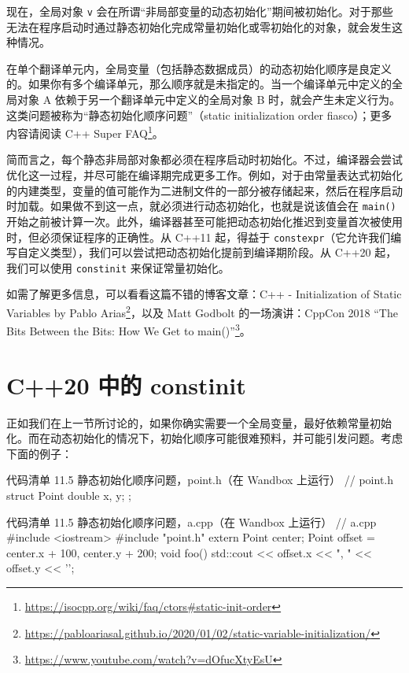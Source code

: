 现在，全局对象 \texttt{v} 会在所谓“非局部变量的动态初始化”期间被初始化。对于那些无法在程序启动时通过静态初始化完成常量初始化或零初始化的对象，就会发生这种情况。

\begin{myWarnBox}
在单个翻译单元内，全局变量（包括静态数据成员）的动态初始化顺序是良定义的。如果你有多个编译单元，那么顺序就是未指定的。当一个编译单元中定义的全局对象 A 依赖于另一个翻译单元中定义的全局对象 B 时，就会产生未定义行为。这类问题被称为“静态初始化顺序问题”（static initialization order fiasco）；更多内容请阅读 C++ Super FAQ\footnote{\url{https://isocpp.org/wiki/faq/ctors\#static-init-order}}。
\end{myWarnBox}

简而言之，每个静态非局部对象都必须在程序启动时初始化。不过，编译器会尝试优化这一过程，并尽可能在编译期完成更多工作。例如，对于由常量表达式初始化的内建类型，变量的值可能作为二进制文件的一部分被存储起来，然后在程序启动时加载。如果做不到这一点，就必须进行动态初始化，也就是说该值会在 \texttt{main()} 开始之前被计算一次。此外，编译器甚至可能把动态初始化推迟到变量首次被使用时，但必须保证程序的正确性。从 C++11 起，得益于 \texttt{constexpr}（它允许我们编写自定义类型），我们可以尝试把动态初始化提前到编译期阶段。从 C++20 起，我们可以使用 \texttt{constinit} 来保证常量初始化。

\begin{myInfoBox}
如需了解更多信息，可以看看这篇不错的博客文章：C++ - Initialization of Static Variables by Pablo Arias\footnote{\url{https://pabloariasal.github.io/2020/01/02/static-variable-initialization/}}，以及 Matt Godbolt 的一场演讲：CppCon 2018 “The Bits Between the Bits: How We Get to main()”\footnote{\url{https://www.youtube.com/watch?v=dOfucXtyEsU}}。
\end{myInfoBox}



\section{C++20 中的 constinit}

正如我们在上一节所讨论的，如果你确实需要一个全局变量，最好依赖常量初始化。而在动态初始化的情况下，初始化顺序可能很难预料，并可能引发问题。考虑下面的例子：

\begin{codeboxt}[cpp]{代码清单 11.5 静态初始化顺序问题，point.h（在 Wandbox 上运行）}
// point.h
struct Point {
double x, y;
};
\end{codeboxt}

\begin{codeboxt}[cpp]{代码清单 11.5 静态初始化顺序问题，a.cpp（在 Wandbox 上运行）}
// a.cpp
#include <iostream>
#include "point.h"
extern Point center;
Point offset = { center.x + 100, center.y + 200};
void foo() {
std::cout << offset.x << ", " << offset.y << '\n';
}
\end{codeboxt}

